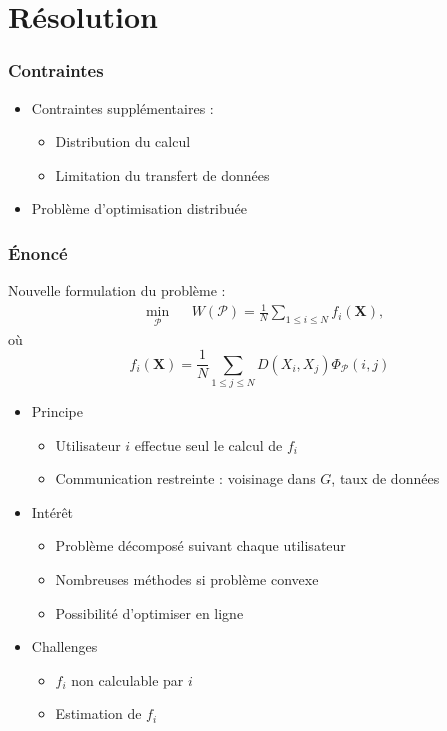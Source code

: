 \documentclass[c]{beamer}
\begin{document}
\section{Résolution}
\begin{frame}
    \frametitle{Contraintes}

    \begin{itemize}
        \item Contraintes supplémentaires :
        \begin{itemize}
            \item Distribution du calcul
            \item Limitation du transfert de données
        \end{itemize}
    
        \item Problème d'optimisation distribuée
    \end{itemize}

\end{frame}

\begin{frame}
    \frametitle{Énoncé}

    Nouvelle formulation du problème :
    \[
        \begin{aligned}
            & \min_{\mathcal{P}}
            && W\left(\mathcal{P} \right)
            = \frac{1}{N} \sum_{1 \leq i \leq N} f_i(\mathbf{X}),
        \end{aligned}
    \]
    où
    \[
        f_i(\mathbf{X}) = \frac{1}{N} \sum_{1 \leq j \leq N} D(X_i, X_j) \Phi_{\mathcal{P}}(i, j)
    \]
\end{frame}

\begin{frame}

    \begin{itemize}
        \item Principe
            \begin{itemize}
            \item Utilisateur $i$ effectue seul le calcul de $f_i$
            \item Communication restreinte : voisinage dans $G$, taux de donn\'ees
            \end{itemize}
        \item Intérêt
            \begin{itemize}
                    \item Problème décomposé suivant chaque utilisateur
                    \item Nombreuses méthodes si problème convexe
                    \item Possibilité d'optimiser en ligne
            \end{itemize}
        \item Challenges
            \begin{itemize}
                \item $f_i$ non calculable par $i$
                \item Estimation de $f_i$
            \end{itemize}
    \end{itemize}

\end{frame}
\end{document}
